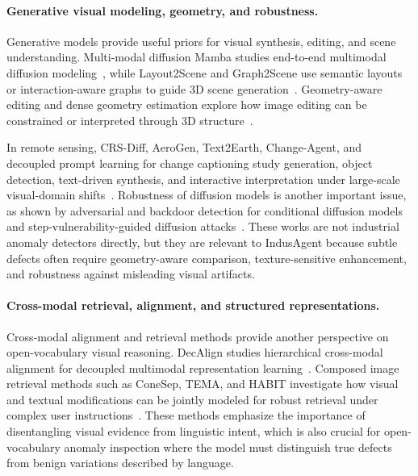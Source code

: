 \documentclass{article}
\begin{document}
{\paragraph{Generative visual modeling, geometry, and robustness.}
Generative models provide useful priors for visual synthesis, editing, and scene understanding. Multi-modal diffusion Mamba studies end-to-end multimodal diffusion modeling~\citep{lu2025end}, while Layout2Scene and Graph2Scene use semantic layouts or interaction-aware graphs to guide 3D scene generation~\citep{chen2025layout2scene, chen2025graph2scene}. Geometry-aware editing and dense geometry estimation explore how image editing can be constrained or interpreted through 3D structure~\citep{wang2026geometry, wang2025editor}. 

In remote sensing, CRS-Diff, AeroGen, Text2Earth, Change-Agent, and decoupled prompt learning for change captioning study generation, object detection, text-driven synthesis, and interactive interpretation under large-scale visual-domain shifts~\citep{tang2024crs, tang2025aerogen, liu2025text2earth, liu2024changeagent, liu2023decoupling}. Robustness of diffusion models is another important issue, as shown by adversarial and backdoor detection for conditional diffusion models and step-vulnerability-guided diffusion attacks~\citep{yu2025dadet, yu2024step}. These works are not industrial anomaly detectors directly, but they are relevant to IndusAgent because subtle defects often require geometry-aware comparison, texture-sensitive enhancement, and robustness against misleading visual artifacts.

\paragraph{Cross-modal retrieval, alignment, and structured representations.}
Cross-modal alignment and retrieval methods provide another perspective on open-vocabulary visual reasoning. DecAlign studies hierarchical cross-modal alignment for decoupled multimodal representation learning~\citep{qian2025decalign}. Composed image retrieval methods such as ConeSep, TEMA, and HABIT investigate how visual and textual modifications can be jointly modeled for robust retrieval under complex user instructions~\citep{ConeSep, TEMA, HABIT}. These methods emphasize the importance of disentangling visual evidence from linguistic intent, which is also crucial for open-vocabulary anomaly inspection where the model must distinguish true defects from benign variations described by language.

}
\end{document}
